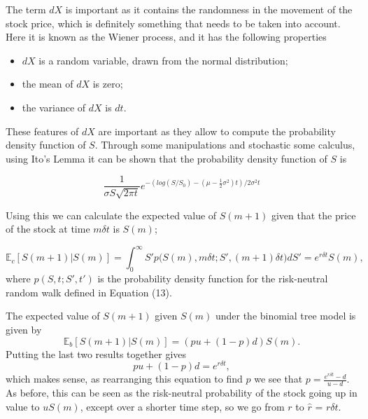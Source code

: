 \documentclass[letterpaper,12pt]{article}
\theoremstyle{plain}
\numberwithin{equation}{section}
\begin{document}
The term $dX$ is important as it contains the randomness in the movement of the stock price, which is definitely something that needs to be taken into account. Here it is known as the Wiener process, and it has the following properties \cite{MFD}
\begin{itemize}
	\item $dX$ is a random variable, drawn from the normal distribution;
	\item the mean of $dX$ is zero;
	\item the variance of $dX$ is $dt$.
\end{itemize} 
These features of $dX$ are important as they allow to compute the probability density function of $S$. Through some manipulations and stochastic some calculus, using Ito's Lemma it can be shown \cite{MFD} that the probability density function of $S$ is


\begin{equation}
	\frac{1}{\sigma S \sqrt{2\pi t}}e^{-(log(S/S_0) - (\mu- \frac{1}{2}\sigma^2)t)/2\sigma^2t}
\end{equation}

Using this we can calculate the expected value of $S(m+1)$ given that the price of the stock at time $m\delta t$ is $S(m)$;

\begin{equation*}
	\mathbb{E}_c[S(m+1)|S(m)] = \int_0^\infty S'p\bigg( S(m), m\delta t; S', (m+1)\delta t\bigg)dS' = e^{r\delta t}S(m),
\end{equation*}
where $p( S, t; S', t')$ is the probability density function for the risk-neutral random walk defined in Equation (13).

The expected value of $S(m+1)$ given $S(m)$ under the binomial tree model is given by
\begin{equation*}
	\mathbb{E}_b[S(m+1)|S(m)] = (pu + (1-p)d)S(m).
\end{equation*}
Putting the last two results together gives 
\begin{equation}
	pu + (1-p)d = e^{r\delta t},
\end{equation}
which makes sense, as rearranging this equation to find $p$ we see that $p = \frac{e^{r\delta t} - d}{u-d}$. As before, this can be seen as the risk-neutral probability of the stock going up in value to $uS(m)$, except over a shorter time step, so we go from $r$ to $\hat{r}$ = $r\delta t$.
\end{document}
